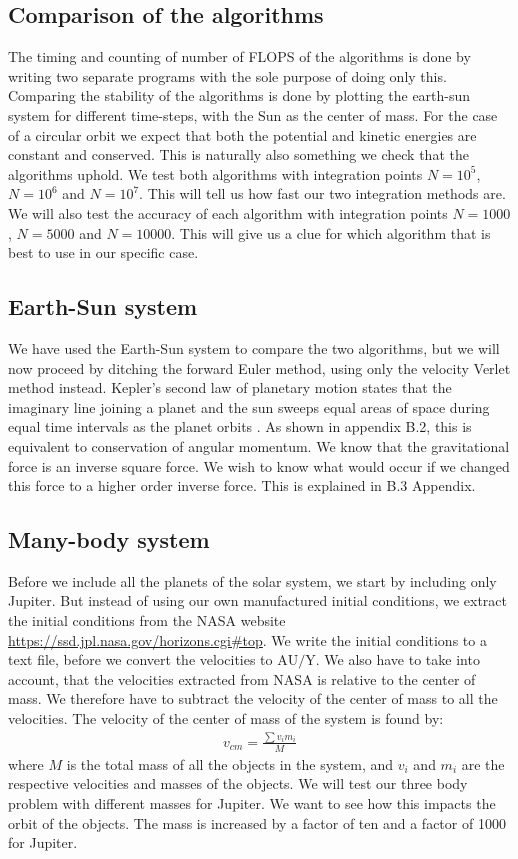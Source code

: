 \documentclass{article}
\begin{document}
\begin{multicols}{2}
\subsection{Comparison of the algorithms}
The timing and counting of number of FLOPS of the algorithms is done by writing two separate programs with the sole purpose of doing only this. Comparing the stability of the algorithms is done by plotting the earth-sun system for different time-steps, with the Sun as the center of mass. For the case of a circular orbit we expect that both the potential and kinetic energies are constant and conserved. This is naturally also something we check that the algorithms uphold. We test both algorithms with integration points $N=10^5$, $N=10^6$ and $N=10^7$. This will tell us how fast our two integration methods are. We will also test the accuracy of each algorithm with integration points $N=1000$, $N=5000$ and $N=10000$. This will give us a clue for which algorithm that is best to use in our specific case. 

\subsection{Earth-Sun system}

We have used the Earth-Sun system to compare the two algorithms, but we will now proceed by ditching the forward Euler method, using only the velocity Verlet method instead. Kepler's second law of planetary motion states that the imaginary line joining a planet and the sun sweeps equal areas of space during equal time intervals as the planet orbits \cite{94}. As shown in  appendix B.2, this is equivalent to conservation of angular momentum. We know that the gravitational force is an inverse square force. We wish to know what would occur if we changed this force to a higher order inverse force. This is explained in B.3 Appendix.

\subsection{Many-body system}

Before we include all the planets of the solar system, we start by including only Jupiter. But instead of using our own manufactured initial conditions, we extract the initial conditions from the NASA website \url{https://ssd.jpl.nasa.gov/horizons.cgi#top}. We write the initial conditions to a text file, before we convert the velocities to $\text{AU/Y}$. We also have to take into account, that the velocities extracted from NASA is relative to the center of mass. We therefore have to subtract the velocity of the center of mass to all the velocities. The velocity of the center of mass of the system is found by:
\begin{align}
v_{cm} = \frac{\sum v_i m_i}{M}
\end{align}
where $M$ is the total mass of all the objects in the system, and $v_i$ and $m_i$ are the respective velocities and masses of the objects. We will test our three body problem with different masses for Jupiter. We want to see how this impacts the orbit of the objects. The mass is increased by a factor of ten and a factor of 1000 for Jupiter. 


\end{multicols}
\end{document}
